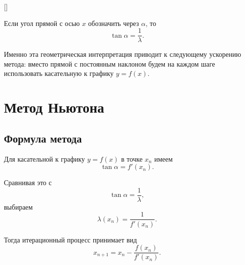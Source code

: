 \documentclass[../final.tex]{subfiles}
\begin{document}
\begin{rbox}[left=18pt,right=18pt,top=14pt,bottom=10pt]{[]}

    \captionsetup{
        font=footnotesize,
        labelfont=bf,
        skip=5pt
    }

    \label{fig:ovf_corrected_iterations}
\end{rbox}

Если угол прямой с осью $x$ обозначить через $\alpha$, то
%
\begin{equation*}
    \tan\alpha=\frac{1}{\lambda}.
\end{equation*}

Именно эта геометрическая интерпретация приводит к следующему
ускорению метода: вместо прямой с постоянным наклоном будем на каждом
шаге использовать касательную к графику $y=f(x)$.


\section{Метод Ньютона}

\subsection{Формула метода}

Для касательной к графику $y=f(x)$ в точке $x_n$ имеем
%
\begin{equation*}
    \tan\alpha=f'(x_n).
\end{equation*}

Сравнивая это с
%
\begin{equation*}
    \tan\alpha=\frac{1}{\lambda},
\end{equation*}
%
выбираем
%
\begin{equation*}
    \lambda(x_n)=\frac{1}{f'(x_n)}.
\end{equation*}

Тогда итерационный процесс принимает вид
%
\begin{equation*}
    x_{n+1}
    =
    x_n
    -
    \frac{f(x_n)}{f'(x_n)}.
\end{equation*}
\end{document}
